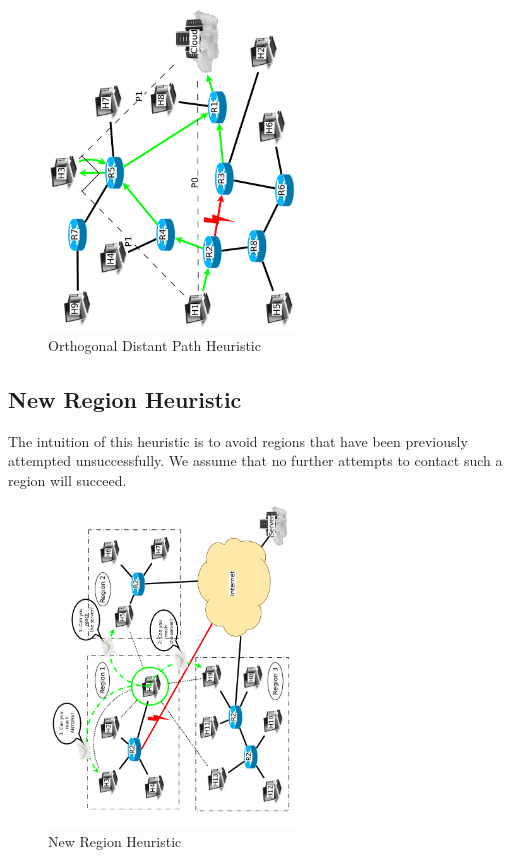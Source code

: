 \documentclass[conference]{IEEEtran}
\begin{document}
\begin{figure}
\centering
\includegraphics[width=2.6in,angle=-90]{../../images/diagrams/angular_path}
\caption{Orthogonal Distant Path Heuristic}
\end{figure}

%

\subsection{New Region Heuristic}
The intuition of this heuristic is to avoid regions that have been previously attempted unsuccessfully.  We assume that no further attempts to contact such a region will succeed.
\begin{algorithm}
\DontPrintSemicolon
{}
\SetAlgoLined
\SetAlgoLongEnd
\scriptsize
{}
\caption{}
\small
\end{algorithm}

\begin{figure}
\centering
\includegraphics[width=2.6in,angle=-90]{../../images/diagrams/new_region_all}
\caption{New Region Heuristic}
\end{figure}
\end{document}
